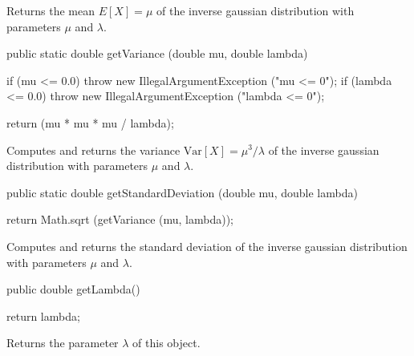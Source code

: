 \begin{tabb} Returns the mean $E[X] = \mu$ of the
   inverse gaussian distribution with parameters $\mu$ and $\lambda$.
\end{tabb}
\begin{htmlonly}
\end{htmlonly}
\begin{code}

   public static double getVariance (double mu, double lambda)\begin{hide} {
      if (mu <= 0.0)
         throw new IllegalArgumentException ("mu <= 0");
      if (lambda <= 0.0)
         throw new IllegalArgumentException ("lambda <= 0");

      return (mu * mu * mu / lambda);
   }\end{hide}
\end{code}
\begin{tabb}  Computes and returns the variance $\mbox{Var}[X] = \mu^3/\lambda$ of
   the inverse gaussian distribution with parameters $\mu$ and $\lambda$.
\end{tabb}
\begin{htmlonly}
   \return{the variance of the inverse gaussian distribution
   $\mbox{Var}[X] = \mu^3 / \lambda$
\end{htmlonly}
\begin{code}

   public static double getStandardDeviation (double mu, double lambda)\begin{hide} {
      return Math.sqrt (getVariance (mu, lambda));
   }\end{hide}
\end{code}
\begin{tabb}  Computes and returns the standard deviation
   of the inverse gaussian distribution with parameters $\mu$ and $\lambda$.
\end{tabb}
\begin{htmlonly}
\end{htmlonly}
\begin{code}

   public double getLambda()\begin{hide} {
      return lambda;
   }\end{hide}
\end{code}
 \begin{tabb} Returns the parameter $\lambda$ of this object.
 \end{tabb}
